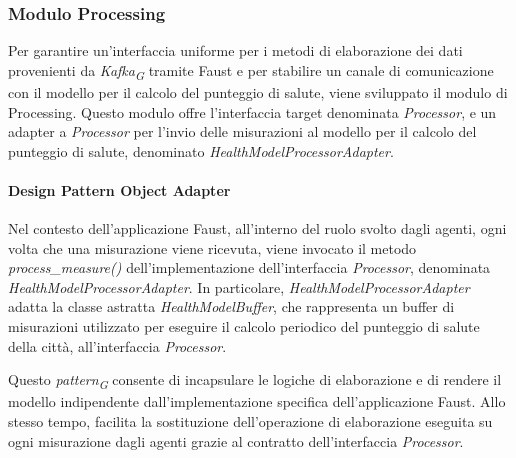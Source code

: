 \subsubsection{Modulo Processing}
Per garantire un'interfaccia uniforme per i metodi di elaborazione dei dati provenienti da \textit{Kafka}\textsubscript{\textit{G}} tramite Faust e per stabilire un canale di comunicazione con il modello per il calcolo del punteggio di salute, viene sviluppato il modulo di Processing. Questo modulo offre l'interfaccia target denominata \textit{Processor}, e un adapter a \textit{Processor} per l'invio delle misurazioni al modello per il calcolo del punteggio di salute, denominato \textit{HealthModelProcessorAdapter}.

\paragraph*{Design Pattern Object Adapter}
Nel contesto dell'applicazione Faust, all'interno del ruolo svolto dagli agenti, ogni volta che una misurazione viene ricevuta, viene invocato il metodo \textit{process\_measure()} dell'implementazione dell'interfaccia \textit{Processor}, denominata \textit{HealthModelProcessorAdapter}. In particolare, \textit{HealthModelProcessorAdapter} adatta la classe astratta \textit{HealthModelBuffer}, che rappresenta un buffer di misurazioni utilizzato per eseguire il calcolo periodico del punteggio di salute della città, all'interfaccia \textit{Processor}.

Questo \textit{pattern}\textsubscript{\textit{G}} consente di incapsulare le logiche di elaborazione e di rendere il modello indipendente dall'implementazione specifica dell'applicazione Faust. Allo stesso tempo, facilita la sostituzione dell'operazione di elaborazione eseguita su ogni misurazione dagli agenti grazie al contratto dell'interfaccia \textit{Processor}.
